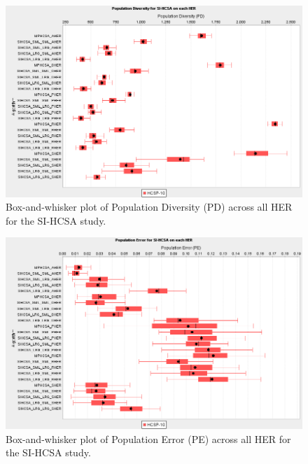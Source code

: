 \begin{figure}[htp]
	\centering
		\includegraphics[scale=0.70]{Hosts/SI-HCSA-PD}
	\caption{Box-and-whisker plot of Population Diversity (PD) across all HER for the SI-HCSA study.}
	\label{fig:hosts:sihcsa:pd:boxplot}
\end{figure}

\begin{figure}[htp]
	\centering
		\includegraphics[scale=0.70]{Hosts/SI-HCSA-PE}
	\caption{Box-and-whisker plot of Population Error (PE) across all HER for the SI-HCSA study.}
	\label{fig:hosts:sihcsa:pe:boxplot}
\end{figure}

